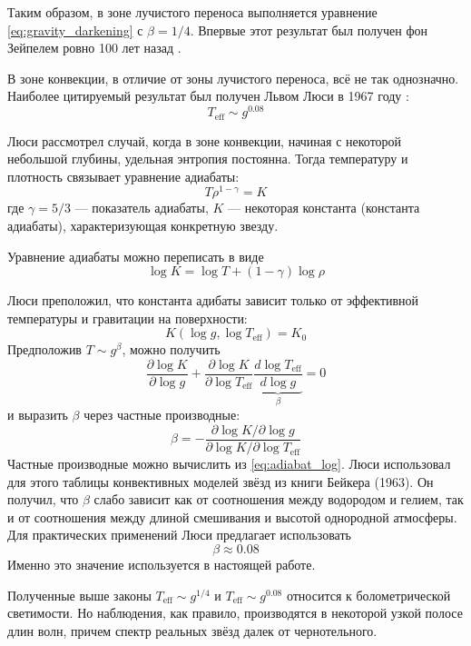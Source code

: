 Таким образом, в зоне лучистого переноса выполняется уравнение \eqref{eq:gravity_darkening} с $\beta = 1/4$.
Впервые этот результат был получен фон Зейпелем ровно 100 лет назад \cite{vonZeipel}.



В зоне конвекции, в отличие от зоны лучистого переноса, всё не так однозначно. Наиболее цитируемый результат был получен Львом Люси в 1967 году \cite{Lucy}:
\[
T_\text{eff} \sim g^{0.08}
\]

Люси рассмотрел случай, когда в зоне конвекции, начиная с некоторой небольшой глубины, удельная энтропия постоянна. Тогда температуру и плотность связывает уравнение адиабаты:
\begin{equation*}
T \rho^{1 - \gamma} = K
\label{eq:adiabat}
\end{equation*}
где $\gamma = 5/3$ --- показатель адиабаты, $K$ --- некоторая константа (константа адиабаты), характеризующая конкретную звезду.

Уравнение адиабаты можно переписать в виде
\begin{equation}
\log K = \log T + (1 - \gamma) \log \rho
\label{eq:adiabat_log}
\end{equation}

Люси преположил, что константа адибаты зависит только от эффективной температуры и гравитации на поверхности:
\[
K(\log g, \log T_\text{eff}) = K_0
\]
Предположив $T \sim g^\beta$, можно получить
\[
\frac{\partial \log K}{\partial \log g}
+ \frac{\partial \log K}{\partial \log T_\text{eff}}
\underbrace{\frac{d \log T_\text{eff}}{d \log g}}_{\beta} = 0
\]
и выразить $\beta$ через частные производные:
\[
\beta = -\frac{\partial \log K / \partial \log g}{\partial \log K / \partial \log T_\text{eff}}
\]
Частные производные можно вычислить из \eqref{eq:adiabat_log}. Люси использовал для этого таблицы конвективных моделей звёзд из книги Бейкера (1963). Он получил, что $\beta$ слабо зависит как от соотношения между водородом и гелием, так и от соотношения между длиной смешивания и высотой однородной атмосферы. Для практических применений Люси предлагает использовать
\[
\beta \approx 0.08
\]
Именно это значение используется в настоящей работе.



Полученные выше законы $T_\text{eff} \sim g^{1/4}$ и $T_\text{eff} \sim g^{0.08}$ относится к болометрической светимости.
Но наблюдения, как правило, производятся в некоторой узкой полосе длин волн, причем спектр реальных звёзд далек от чернотельного.

